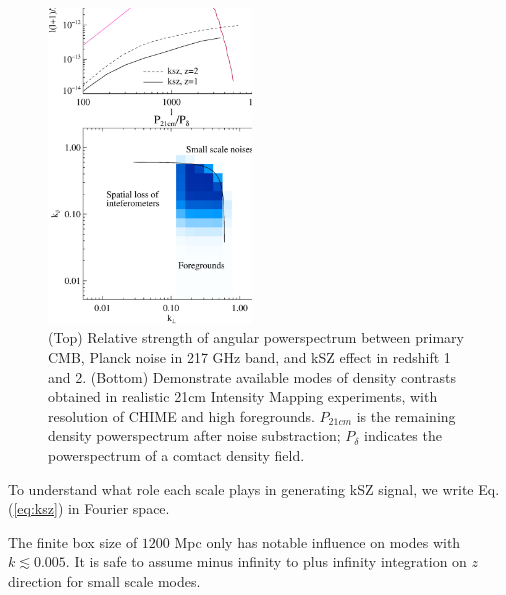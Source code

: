 \begin{figure}[tbp]
\begin{center}
\includegraphics[width=0.48\textwidth]{figure/cmb_21cm.eps}
\end{center}
\vspace{-0.7cm}
\caption{
    (Top) Relative strength of angular powerspectrum between primary CMB, Planck noise in 217 GHz band, and kSZ effect in redshift 1 and 2.
    (Bottom) Demonstrate available modes of density contrasts obtained 
    in realistic 21cm Intensity Mapping experiments, 
    with resolution of CHIME and high foregrounds. 
    $P_{21cm}$ is the remaining density powerspectrum after noise substraction; 
    $P_\delta$ indicates the powerspectrum of a comtact density field.
}
\label{fig:cmb_21cm}
\end{figure}

To understand what role each scale plays in generating kSZ signal, we write Eq.(\ref{eq:ksz}) in Fourier space. 

The finite box size of $1200$ Mpc only has notable influence on modes with $k\lesssim0.005$. 
It is safe to assume 
minus infinity to plus infinity 
integration on $z$ direction for small scale modes. 

